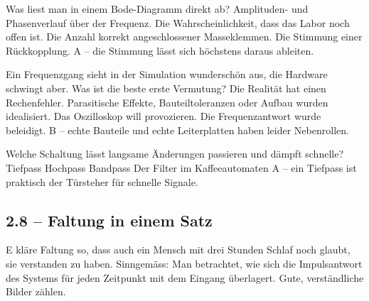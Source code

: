 \documentclass[a4paper,11pt]{article}
\newif\ifloesung
\newcommand{\loesung}[1]{%
  \ifloesung\par\smallskip{\color{zwetschge}\textit{Lösung: #1}}\par\medskip\fi}
\newcommand{\offenfrage}[3]{%
  \subsection*{#1}
  #2
  \loesung{#3}}
\begin{document}
Was liest man in einem Bode-Diagramm direkt ab?
{Amplituden- und Phasenverlauf über der Frequenz.}
{Die Wahrscheinlichkeit, dass das Labor noch offen ist.}
{Die Anzahl korrekt angeschlossener Masseklemmen.}
{Die Stimmung einer Rückkopplung.}
{A -- die Stimmung lässt sich höchstens daraus ableiten.}

Ein Frequenzgang sieht in der Simulation wunderschön aus, die Hardware
schwingt aber. Was ist die beste erste Vermutung?
{Die Realität hat einen Rechenfehler.}
{Parasitische Effekte, Bauteiltoleranzen oder Aufbau wurden idealisiert.}
{Das Oszilloskop will provozieren.}
{Die Frequenzantwort wurde beleidigt.}
{B -- echte Bauteile und echte Leiterplatten haben leider Nebenrollen.}

Welche Schaltung lässt langsame Änderungen passieren und dämpft schnelle?
{Tiefpass}
{Hochpass}
{Bandpass}
{Der Filter im Kaffeeautomaten}
{A -- ein Tiefpass ist praktisch der Türsteher für schnelle Signale.}

\offenfrage{2.8 -- Faltung in einem Satz}
Erkläre Faltung so, dass auch ein Mensch mit drei Stunden Schlaf noch
glaubt, sie verstanden zu haben.
{Sinngemäss: Man betrachtet, wie sich die Impulsantwort des Systems für jeden
Zeitpunkt mit dem Eingang überlagert. Gute, verständliche Bilder zählen.}


\end{document}
